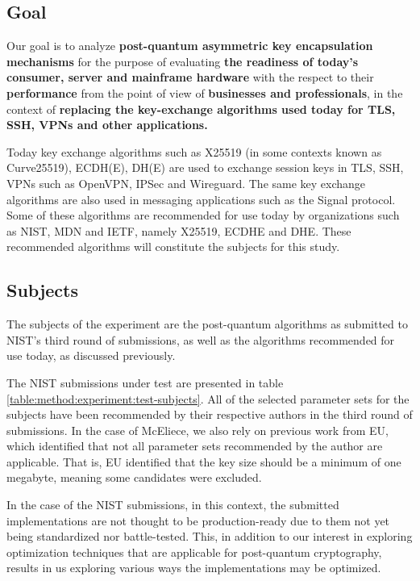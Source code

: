 \subsection{Goal}
\label{section:method:experiment-goal}

Our goal is to analyze \textbf{post-quantum asymmetric key encapsulation mechanisms} for the purpose of evaluating \textbf{the readiness of today's consumer, server and mainframe hardware} with the respect to their \textbf{performance} from the point of view of \textbf{businesses and professionals}, in the context of \textbf{replacing the key-exchange algorithms used today for TLS, SSH, VPNs and other applications.}


Today key exchange algorithms such as X25519 (in some contexts known as Curve25519), ECDH(E), DH(E) are used to exchange session keys in TLS, SSH, VPNs such as OpenVPN, IPSec and Wireguard. The same key exchange algorithms are also used in messaging applications such as the Signal protocol. Some of these algorithms are recommended for use today by organizations such as NIST, MDN and IETF, namely X25519, ECDHE and DHE. These recommended algorithms will constitute the subjects for this study.

\subsection{Subjects}

The subjects of the experiment are the post-quantum algorithms as submitted to NIST's third round of submissions, as well as the algorithms recommended for use today, as discussed previously.

The NIST submissions under test are presented in table \ref{table:method:experiment:test-subjects}. All of the selected parameter sets for the subjects have been recommended by their respective authors in the third round of submissions. In the case of McEliece, we also rely on previous work from EU, which identified that not all parameter sets recommended by the author are applicable. That is, EU identified that the key size should be a minimum of one megabyte, meaning some candidates were excluded.

In the case of the NIST submissions, in this context, the submitted implementations are not thought to be production-ready due to them not yet being standardized nor battle-tested. This, in addition to our interest in exploring optimization techniques that are applicable for post-quantum cryptography, results in us exploring various ways the implementations may be optimized.

